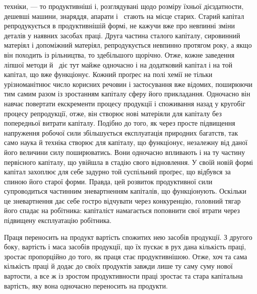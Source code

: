\parcont{}  %
техніки, — то продуктивніші і, розглядувані щодо розміру
їхньої дієздатности, дешевші машини, знаряддя, апарати і~
стають на місце старих. Старий капітал репродукується в продуктивнішій
формі, не кажучи вже про невпинні зміни деталів
у наявних засобах праці. Друга частина сталого капіталу, сировинний
матеріял і допоміжний матеріял, репродукується невпинно
протягом року, а якщо він походить із рільництва, то здебільшого
щорічно. Отже, кожне заведення ліпшої методи й~
діє тут майже одночасно і на додатковий капітал і на той капітал,
що вже функціонує. Кожний проґрес на полі хемії не тільки урізноманітнює
число корисних речовин і застосування вже відомих,
поширюючи тим самим разом із зростанням капіталу сферу його
прикладання. Одночасно він навчає повертати екскременти процесу
продукції і споживання назад у кругобіг процесу репродукції,
отже, він створює нові матеріяли для капіталу без попередньої
витрати капіталу. Подібно до того, як через просте підвищення
напруження робочої сили збільшується експлуатація
природних багатств, так само наука й техніка створює для капіталу,
що функціонує, незалежну від даної його величини силу
поширюватись. Вони одночасно впливають і на ту частину первісного
капіталу, що увійшла в стадію свого відновлення. У своїй
новій формі капітал захоплює для себе задурно той суспільний
проґрес, що відбувся за спиною його старої форми. Правда, цей
розвиток продуктивної сили супроводиться частинним зневартненням
капіталів, що функціонують. Оскільки це зневартнення
дає себе гостро відчувати через конкуренцію, головний тягар
його спадає на робітника: капіталіст намагається поповнити свої
втрати через підвищену експлуатацію робітника.

Праця переносить на продукт вартість спожитих нею засобів
продукції. З другого боку, вартість і маса засобів продукції,
що їх пускає в рух дана кількість праці, зростає пропорційно
до того, як праця стає продуктивнішою. Отже, хоч та сама кількість
праці й додає до своїх продуктів завжди лише ту саму суму
нової вартости, а все ж із зростом продуктивности праці зростає
та стара капітальна вартість, яку вона одночасно переносить
на продукти.

